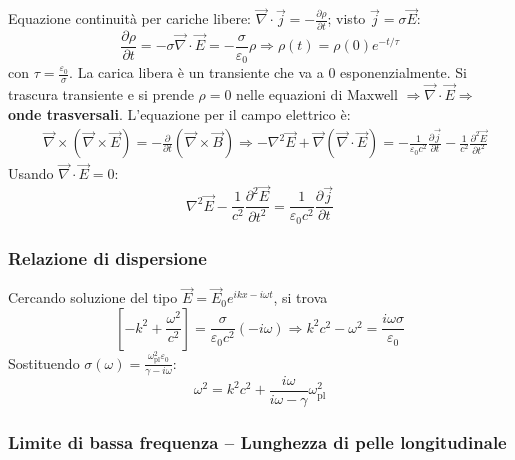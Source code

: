 \documentclass[10pt, a4paper]{scrartcl}
\numberwithin{equation}{subsection}
\theoremstyle{style1}
\begin{document}
Equazione continuit\`a per cariche libere: $\vec{\nabla }\cdot \vec{j}= -\frac{\partial \rho }{\partial t} $; visto $\vec{j}=\sigma \vec{E}$:
\begin{equation}
	\frac{\partial \rho }{\partial t} = - \sigma \vec{\nabla }\cdot \vec{E}= - \frac{\sigma}{\varepsilon _0} \rho \Rightarrow \rho (t) = \rho (0) e^{- t / \tau } 
\end{equation}
con $\tau  = \frac{\varepsilon _0}{\sigma }$. La carica libera \`e un transiente che va a $0$ esponenzialmente. Si trascura transiente e si prende $\rho =0$ nelle equazioni di Maxwell $\Rightarrow \vec{\nabla }\cdot \vec{E}\Rightarrow $ \textbf{onde trasversali}. L'equazione per il campo elettrico \`e:
\[
\begin{split}
	&\vec{\nabla }\times (\vec{\nabla }\times \vec{E}) = - \frac{\partial }{\partial t} (\vec{\nabla }\times \vec{B})\Rightarrow -\nabla ^2 \vec{E}+\vec{\nabla }(\vec{\nabla }\cdot \vec{E}) = -\frac{1}{\varepsilon _0c^2} \frac{\partial \vec{j}}{\partial t } -\frac{1}{c^2}\frac{\partial ^2 \vec{E}}{\partial t^2}  
\end{split}
\] 
Usando $\vec{\nabla }\cdot \vec{E}=0$:
\begin{equation}
	\nabla ^2 \vec{E} -\frac{1}{c^2}\frac{\partial ^2 \vec{E}}{\partial t^2} =\frac{1}{\varepsilon _0 c^2}\frac{\partial \vec{j}}{\partial t} 
\end{equation}
\subsubsection{Relazione di dispersione}

Cercando soluzione del tipo $\vec{E}=\vec{E}_0 e^{ikx - i \omega t} $, si trova
\begin{equation}
		\left[ -k^2 + \frac{\omega^2}{c^2} \right] = \frac{\sigma }{\varepsilon _0 c^2} (-i\omega)\Rightarrow k^2 c^2 - \omega^2 = \frac{i\omega \sigma }{\varepsilon_0}
\end{equation}
Sostituendo $\sigma (\omega) = \frac{\omega_\text{pl}^2 \varepsilon _0}{\gamma-i\omega}$:
\begin{equation}
	\omega^2 = k^2 c^2 + \frac{i\omega}{i\omega -\gamma } \omega_\text{pl}^2
\end{equation}
\subsubsection{Limite di bassa frequenza -- Lunghezza di pelle longitudinale}
\end{document}
